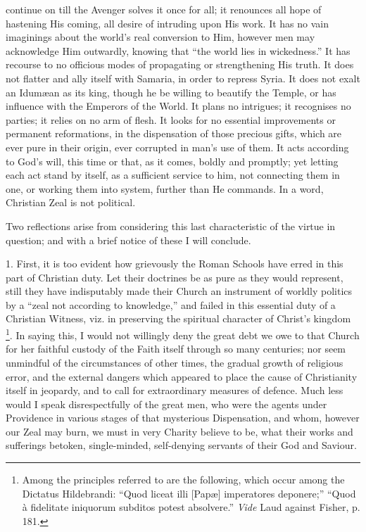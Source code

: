 continue on till the Avenger solves it once for all; it renounces all
hope of hastening His coming, all desire of intruding upon His work. It
has no vain imaginings about the world's real conversion to Him, however
men may acknowledge Him outwardly, knowing that ``the world lies in
wickedness.'' It has recourse to no officious modes of propagating
or strengthening His truth. It does not flatter and ally itself with
Samaria, in order to repress Syria. It does not exalt an Idumæan as its
king, though he be willing to beautify the Temple, or has influence with
the Emperors of the World. It plans no intrigues; it recognises no
parties; it relies on no arm of flesh. It looks for no essential
improvements or permanent reformations, in the dispensation of those
precious gifts, which are ever pure in their origin, ever corrupted in
man's use of them. It acts according to God's will, this time or that,
as it comes, boldly and promptly; yet letting each act stand by itself,
as a sufficient service to him, not connecting them in one, or working
them into system, further than He commands. In a word, Christian Zeal is
not political.

Two reflections arise from considering this last characteristic of
the virtue in question; and with a brief notice of these I will
conclude.

1. First, it is too evident how grievously the Roman Schools have
erred in this part of Christian duty. Let their doctrines be as pure as
they would represent, still they have indisputably made their Church an
instrument of worldly politics by a ``zeal not according to
knowledge,'' and failed in this essential duty of a Christian
Witness, viz. in preserving the spiritual character of Christ's kingdom
\footnote{Among the principles referred to are the
following, which occur among the Dictatus Hildebrandi: ``Quod liceat
illi [Papæ] imperatores deponere;'' ``Quod à fidelitate
iniquorum subditos potest absolvere.'' \emph{Vide} Laud against
Fisher, p. 181.}. In saying this, I would
not willingly deny the great debt we owe to that Church for her faithful
custody of the Faith itself through so many centuries; nor seem
unmindful of the circumstances of other times, the gradual growth of
religious error, and the external dangers which appeared to place the
cause of Christianity itself in jeopardy, and to call for extraordinary
measures of defence. Much less would I speak disrespectfully of the
great men, who were the agents under Providence in various stages of
that mysterious Dispensation, and whom, however our Zeal may burn, we
must in very Charity believe to be, what their works and sufferings
betoken, single-minded, self-denying servants of their God and Saviour.

